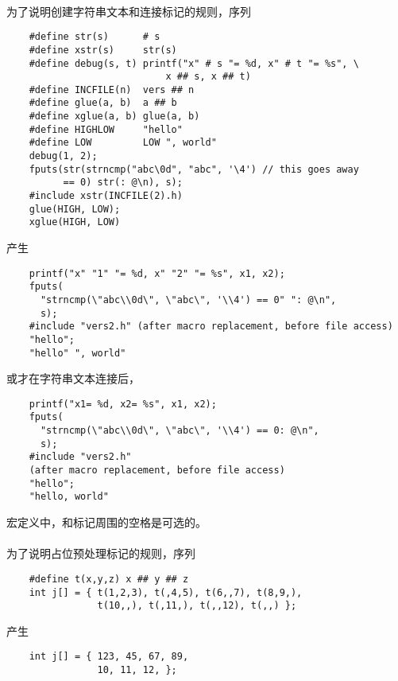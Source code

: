 \paragraph{}
\ex 为了说明创建字符串文本和连接标记的规则，序列
\begin{lstlisting}
    #define str(s)      # s
    #define xstr(s)     str(s)
    #define debug(s, t) printf("x" # s "= %d, x" # t "= %s", \
                            x ## s, x ## t)
    #define INCFILE(n)  vers ## n
    #define glue(a, b)  a ## b
    #define xglue(a, b) glue(a, b)
    #define HIGHLOW     "hello"
    #define LOW         LOW ", world"
    debug(1, 2);
    fputs(str(strncmp("abc\0d", "abc", '\4') // this goes away
          == 0) str(: @\n), s);
    #include xstr(INCFILE(2).h)
    glue(HIGH, LOW);
    xglue(HIGH, LOW)
\end{lstlisting}
产生
\begin{lstlisting}
    printf("x" "1" "= %d, x" "2" "= %s", x1, x2);
    fputs(
      "strncmp(\"abc\\0d\", \"abc\", '\\4') == 0" ": @\n",
      s);
    #include "vers2.h" (after macro replacement, before file access)
    "hello";
    "hello" ", world"
\end{lstlisting}
或才在字符串文本连接后，
\begin{lstlisting}
    printf("x1= %d, x2= %s", x1, x2);
    fputs(
      "strncmp(\"abc\\0d\", \"abc\", '\\4') == 0: @\n",
      s);
    #include "vers2.h"
    (after macro replacement, before file access)
    "hello";
    "hello, world"
\end{lstlisting}
宏定义中，\tm{\#}和\tm{\#\#}标记周围的空格是可选的。

\paragraph{}
\ex 为了说明占位预处理标记的规则，序列
\begin{lstlisting}
    #define t(x,y,z) x ## y ## z
    int j[] = { t(1,2,3), t(,4,5), t(6,,7), t(8,9,),
                t(10,,), t(,11,), t(,,12), t(,,) };
\end{lstlisting}
产生
\begin{lstlisting}
    int j[] = { 123, 45, 67, 89,
                10, 11, 12, };
\end{lstlisting}

